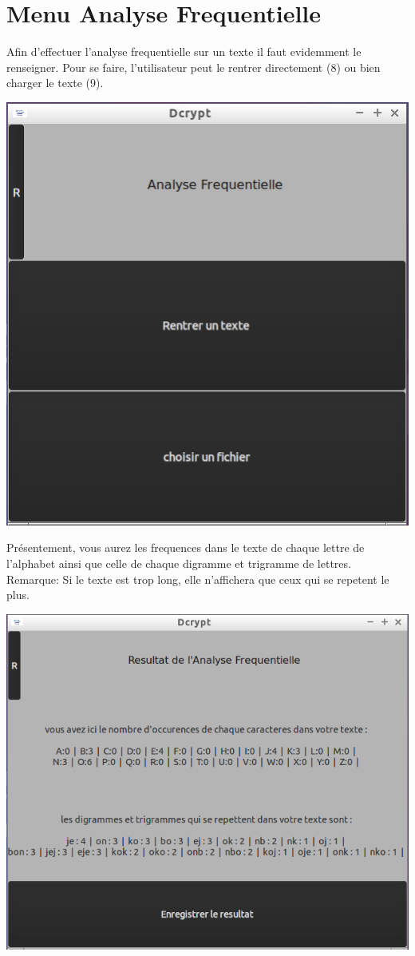 \documentclass[a4]{article}
\begin{document}
		
	\section{Menu Analyse Frequentielle}
			Afin d'effectuer l'analyse frequentielle sur un texte il faut evidemment le renseigner.
 			Pour se faire, l'utilisateur peut le rentrer directement (8) ou bien charger le texte (9).
		\begin{center}\includegraphics[scale=0.4]{17.png}\end{center}
			Présentement, vous aurez les frequences dans le texte de chaque lettre de l'alphabet ainsi que
 			celle de chaque digramme et trigramme de lettres.\\
 			Remarque: Si le texte est trop long, elle n'affichera que ceux qui se repetent le plus.
		\begin{center}\includegraphics[scale=0.4]{18.png}\end{center}
\end{document}
